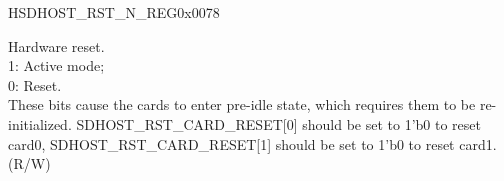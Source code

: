 \begin{register}{H}{SDHOST\_RST\_N\_REG}{0x{}0078}\label{regdesc:RSTNREG}
%
%
\regnewline%
\begin{regdesc}\begin{reglist}
\item [SDHOST\_RST\_CARD\_RESET]Hardware reset.\\
1: Active mode; \\
0: Reset. \\
These bits cause the cards to enter pre-idle state, which requires them to be re-initialized. SDHOST\_RST\_CARD\_RESET[0] should be set to 1'b0 to reset card0, SDHOST\_RST\_CARD\_RESET[1] should be set to 1'b0 to reset card1. (R/W)
\end{reglist}\end{regdesc}
\end{register}



